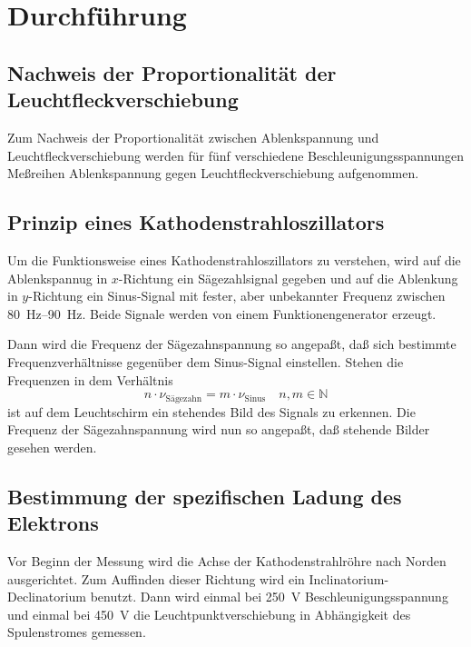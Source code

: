 
\section{Durchführung}
\label{sec:durchfuehrung}

\subsection{Nachweis der Proportionalität der Leuchtfleckverschiebung}

Zum Nachweis der Proportionalität zwischen Ablenkspannung und
Leuchtfleckverschiebung werden für fünf verschiedene
Beschleunigungsspannungen Meßreihen Ablenkspannung gegen
Leuchtfleckverschiebung aufgenommen.

\subsection{Prinzip eines Kathodenstrahloszillators}

Um die Funktionsweise eines Kathodenstrahloszillators zu verstehen, wird
auf die Ablenkspannug in $x$-Richtung ein Sägezahlsignal gegeben und auf
die Ablenkung in $y$-Richtung ein Sinus-Signal mit fester, aber
unbekannter Frequenz zwischen \SIrange{80}{90}{\hertz}. Beide Signale
werden von einem Funktionengenerator erzeugt.

Dann wird die Frequenz der Sägezahnspannung so angepaßt, daß sich
bestimmte Frequenzverhältnisse gegenüber dem Sinus-Signal
einstellen. Stehen die Frequenzen in dem Verhältnis
%
\begin{equation}
  \label{eq:synchro-constraint}
  n \cdot \nu_\text{Sägezahn} = m \cdot \nu_\text{Sinus} \quad n, m\in\mathbb{N}
\end{equation}
%
ist auf dem Leuchtschirm ein stehendes Bild des Signals zu erkennen. Die
Frequenz der Sägezahnspannung wird nun so angepaßt, daß stehende Bilder
gesehen werden.

\subsection{Bestimmung der spezifischen Ladung des Elektrons}

Vor Beginn der Messung wird die Achse der Kathodenstrahlröhre nach
Norden ausgerichtet. Zum Auffinden dieser Richtung wird ein
Inclinatorium-Declinatorium benutzt. Dann wird einmal bei
\SI{250}{\volt} Beschleunigungsspannung und einmal bei \SI{450}{\volt}
die Leuchtpunktverschiebung in Abhängigkeit des Spulenstromes gemessen.

